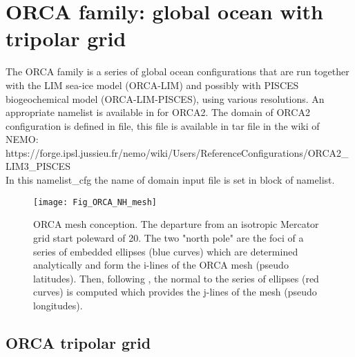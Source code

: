 \documentclass[../tex_main/NEMO_manual]{subfiles}
\begin{document}

\section{ORCA family: global ocean with tripolar grid}
\label{sec:CFG_orca}

The ORCA family is a series of global ocean configurations that are run together with
the LIM sea-ice model (ORCA-LIM) and possibly with PISCES biogeochemical model (ORCA-LIM-PISCES),
using various resolutions.
An appropriate namelist is available in  for ORCA2.
The domain of ORCA2 configuration is defined in  file,
this file is available in tar file in the wiki of NEMO: \\
https://forge.ipsl.jussieu.fr/nemo/wiki/Users/ReferenceConfigurations/ORCA2\_LIM3\_PISCES \\
In this namelist\_cfg the name of domain input file is set in  block of namelist. 

\begin{figure}[!t]
  \begin{center}
    \texttt{[image: Fig\_ORCA\_NH\_mesh]}
    \caption{  \protect\label{fig:MISC_ORCA_msh}
      ORCA mesh conception.
      The departure from an isotropic Mercator grid start poleward of 20\degN.
      The two "north pole" are the foci of a series of embedded ellipses (blue curves) which
      are determined analytically and form the i-lines of the ORCA mesh (pseudo latitudes).
      Then, following \citet{Madec_Imbard_CD96}, the normal to the series of ellipses (red curves) is computed which
      provides the j-lines of the mesh (pseudo longitudes).  }
  \end{center}
\end{figure}

\subsection{ORCA tripolar grid}
\label{subsec:CFG_orca_grid}
\end{document}
